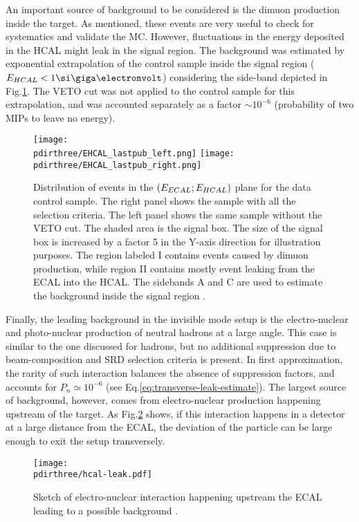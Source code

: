 An important source of background to be considered is the dimuon production inside the target. As mentioned, these events are very useful to check for systematics and validate the MC. However, fluctuations in the energy deposited in the HCAL might leak in the signal region. The background was estimated by exponential extrapolation of the control sample inside the signal region ($E_{HCAL} < 1 \gev$) considering the side-band depicted in Fig.\ref{fig:ehcal-bkg-bands}. The VETO cut was not applied to the control sample for this extrapolation, and was accounted separately as a factor $\sim 10^{-6}$ (probability of two MIPs to leave no energy).

\begin{figure}[bth!]
  \centering
  \texttt{[image: \\pdirthree/EHCAL\_lastpub\_left.png]}
  \texttt{[image: \\pdirthree/EHCAL\_lastpub\_right.png]}
  \caption[ECAL vs HCAL events band]{Distribution of events in the $(E_{ECAL};E_{HCAL})$ plane for the data control sample. The right panel shows the sample with all the selection criteria. The left panel shows the same sample without the VETO cut. The shaded area is the signal box. The size of the signal box is increased by a factor 5 in the Y-axis direction for illustration purposes. The region labeled I contains events caused by dimuon production, while region II contains mostly event leaking from the ECAL into the HCAL. The sidebands A and C are used to estimate the background inside the signal region \cite{NA64:2019imj}.}
  \label{fig:ehcal-bkg-bands}
\end{figure}

Finally, the leading background in the invisible mode setup is the electro-nuclear and photo-nuclear production of neutral hadrons at a large angle. This case is similar to the one discussed for hadrons, but no additional suppression due to beam-composition and SRD selection criteria is present. In first approximation, the rarity of such interaction balances the absence of suppression factors, and accounts for $P_n \simeq 10^{-6}$ (see Eq.\ref{eq:transverse-leak-estimate}).
The largest source of background, however, comes from electro-nuclear production happening upstream of the target. As Fig.\ref{fig:eh-prod-sketch} shows, if this interaction happens in a detector at a large distance from the ECAL, the deviation of the particle can be large enough to exit the setup transversely. 


\begin{figure}[bth!]
  \centering
  \texttt{[image: \\pdirthree/hcal-leak.pdf]}
  \caption[upstream electro-hadron production upstream]{Sketch of electro-nuclear interaction happening upstream the ECAL leading to a possible background \cite{pdegen-thesis}.}
  \label{fig:eh-prod-sketch}
\end{figure}

